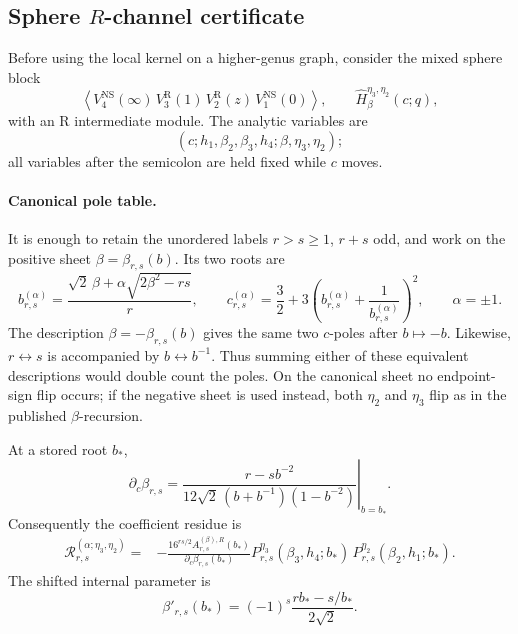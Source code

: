 \documentclass[11pt]{article}
\newcommand{\NS}{\mathrm{NS}}
\newcommand{\R}{\mathrm{R}}
\begin{document}
\subsection{Sphere \(R\)-channel certificate}
\label{sec:sphere-r-c-certificate}

Before using the local kernel on a higher-genus graph, consider the mixed
sphere block
\begin{equation}
 \left\langle
 V^{\NS}_4(\infty)\,
 V^{\R}_3(1)\,
 V^{\R}_2(z)\,
 V^{\NS}_1(0)
 \right\rangle ,
 \qquad
 \widehat H_{\beta}^{\eta_3,\eta_2}(c;q),
 \label{eq:sphere-r-test-block}
\end{equation}
with an R intermediate module.  The analytic variables are
\begin{equation}
 \left(c;h_1,\beta_2,\beta_3,h_4;\beta,\eta_3,\eta_2\right);
 \label{eq:sphere-r-fixed-data}
\end{equation}
all variables after the semicolon are held fixed while \(c\) moves.

\paragraph{Canonical pole table.}
It is enough to retain the unordered labels
\(r>s\geq1\), \(r+s\) odd, and work on the positive sheet
\(\beta=\beta_{r,s}(b)\).  Its two roots are
\begin{equation}
 b_{r,s}^{(\alpha)}
 =
 \frac{\sqrt2\,\beta+
 \alpha\sqrt{2\beta^2-rs}}{r},
 \qquad
 c_{r,s}^{(\alpha)}
 =
 \frac32+3\left(
 b_{r,s}^{(\alpha)}+
 \frac{1}{b_{r,s}^{(\alpha)}}\right)^2,
 \qquad \alpha=\pm1 .
 \label{eq:sphere-r-two-c-poles}
\end{equation}
The description \(\beta=-\beta_{r,s}(b)\) gives the same two \(c\)-poles
after \(b\mapsto-b\).  Likewise, \(r\leftrightarrow s\) is accompanied by
\(b\leftrightarrow b^{-1}\).  Thus summing either of these equivalent
descriptions would double count the poles.  On the canonical sheet no
endpoint-sign flip occurs; if the negative sheet is used instead, both
\(\eta_2\) and \(\eta_3\) flip as in the published \(\beta\)-recursion.

At a stored root \(b_*\),
\begin{equation}
 \partial_c\beta_{r,s}
 =
 \left.
 \frac{r-sb^{-2}}
 {12\sqrt2\,(b+b^{-1})(1-b^{-2})}
 \right|_{b=b_*}.
 \label{eq:sphere-r-db-dc}
\end{equation}
Consequently the coefficient residue is
\begin{equation}
 \begin{split}
 \mathcal R_{r,s}^{(\alpha;\eta_3,\eta_2)}
 ={}&
 -\frac{16^{rs/2}A^{(\beta),R}_{r,s}(b_*)}
 {\partial_c\beta_{r,s}(b_*)}
 P_{r,s}^{\eta_3}(\beta_3,h_4;b_*)\,
 P_{r,s}^{\eta_2}(\beta_2,h_1;b_*).
 \end{split}
 \label{eq:sphere-r-c-residue}
\end{equation}
The shifted internal parameter is
\begin{equation}
 \beta'_{r,s}(b_*)
 =
 (-1)^s\frac{rb_*-s/b_*}{2\sqrt2}.
 \label{eq:sphere-r-beta-prime}
\end{equation}
\end{document}
